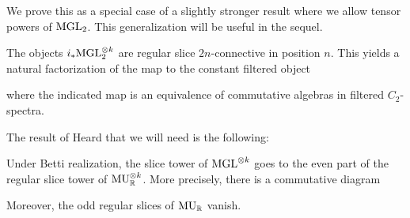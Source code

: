 We prove this as a special case of a slightly stronger result where we allow tensor powers of $\mathrm{MGL}_2$. This generalization will be useful in the sequel.

\begin{prop} \label{prop:P-MGL-power}
  The objects $i_* \mathrm{MGL}_2^{\otimes k}$ are regular slice $2n$-connective in position $n$.
  This yields a natural factorization of the map to the constant filtered object
  \begin{center}  \end{center}
  where the indicated map
  is an equivalence of commutative algebras in filtered $C_2$-spectra.
\end{prop}     



The result of Heard that we will need is the following:

\begin{thm} \label{thm:slice-comp}
  Under Betti realization, the slice tower of $\mathrm{MGL} ^{\otimes k}$ goes to the even part of the regular slice tower of $\mathrm{MU}_{\mathbb{R}}^{\otimes k}$.
  More precisely, there is a commutative diagram
  \begin{center}  \end{center}  
  Moreover, the odd regular slices of $\mathrm{MU}_{\mathbb{R}}$ vanish.
\end{thm}

